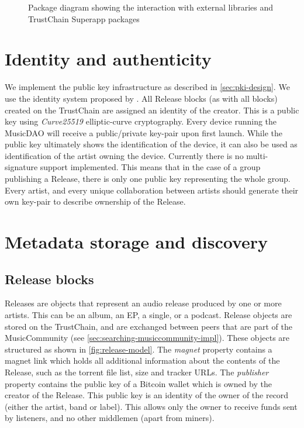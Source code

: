 \begin{figure}
        \caption{Package diagram showing the interaction with external libraries and TrustChain Superapp packages}
        \label{fig:package-diagram}
    \endminipage
\end{figure}

\section{Identity and authenticity}
We implement the public key infrastructure as described in \ref{sec:pki-design}. We use the identity system proposed by \cite{mattskala2020}. All Release blocks (as with all blocks) created on the TrustChain are assigned an identity of the creator. This is a public key using \textit{Curve25519} elliptic-curve cryptography. Every device running the MusicDAO will receive a public/private key-pair upon first launch. While the public key ultimately shows the identification of the device, it can also be used as identification of the artist owning the device. Currently there is no multi-signature support implemented. This means that in the case of a group publishing a Release, there is only one public key representing the whole group. Every artist, and every unique collaboration between artists should generate their own key-pair to describe ownership of the Release.

\section{Metadata storage and discovery}
\subsection{Release blocks}
Releases are objects that represent an audio release produced by one or more artists. This can be an album, an EP, a single, or a podcast. Release objects are stored on the TrustChain, and are exchanged between peers that are part of the MusicCommunity (see \ref{sec:searching-musiccommunity-impl}). These objects are structured as shown in \ref{fig:release-model}. The \textit{magnet} property contains a magnet link which holds all additional information about the contents of the Release, such as the torrent file list, size and tracker URLs. The \textit{publisher} property contains the public key of a Bitcoin wallet which is owned by the creator of the Release. This public key is an identity of the owner of the record (either the artist, band or label). This allows only the owner to receive funds sent by listeners, and no other middlemen (apart from miners).

